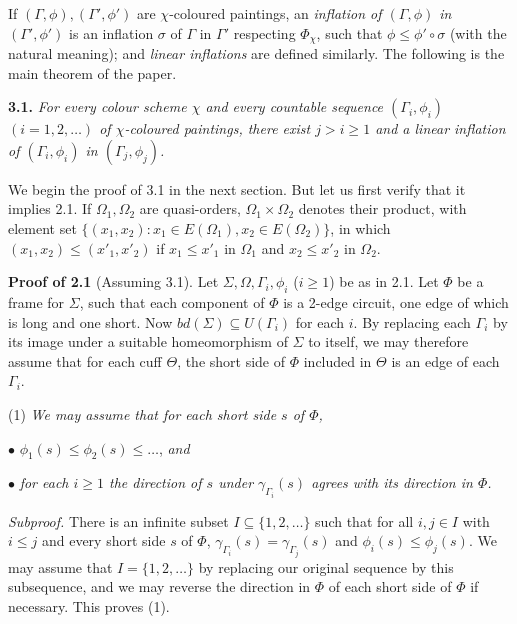 If $(\Gamma,\phi),(\Gamma',\phi')$ are $\chi$-coloured paintings, an \textit{inflation of $(\Gamma,\phi)$ in $(\Gamma',\phi')$} is an inflation $\sigma$ of $\Gamma$ in $\Gamma'$ respecting $\Phi_\chi$, such that $\phi\le \phi'\circ \sigma$ (with the natural meaning); and \textit{linear inflations} are defined similarly. The following is the main theorem of the paper.

\textbf{3.1.} \textit{For every colour scheme $\chi$ and every countable sequence $(\Gamma_i,\phi_i)$ $(i=1,2,\dots)$ of $\chi$-coloured paintings, there exist $j>i\ge 1$ and a linear inflation of $(\Gamma_i,\phi_i)$ in $(\Gamma_j,\phi_j)$.}

We begin the proof of 3.1 in the next section. But let us first verify that it implies 2.1. If $\Omega_1,\Omega_2$ are quasi-orders, $\Omega_1\times \Omega_2$ denotes their product, with element set $\{(x_1,x_2):x_1\in E(\Omega_1), x_2\in E(\Omega_2)\}$, in which $(x_1,x_2)\le (x'_1,x'_2)$ if $x_1\le x'_1$ in $\Omega_1$ and $x_2\le x'_2$ in $\Omega_2$.

\textbf{Proof of 2.1} (Assuming 3.1). Let $\Sigma,\Omega,\Gamma_i,\phi_i$ ($i\ge 1$) be as in 2.1. Let $\Phi$ be a frame for $\Sigma$, such that each component of $\Phi$ is a 2-edge circuit, one edge of which is long and one short. Now $bd(\Sigma)\subseteq U(\Gamma_i)$ for each $i$. By replacing each $\Gamma_i$ by its image under a suitable homeomorphism of $\Sigma$ to itself, we may therefore assume that for each cuff $\Theta$, the short side of $\Phi$ included in $\Theta$ is an edge of each $\Gamma_i$.

\hspace*{12pt}(1) \textit{We may assume that for each short side $s$ of $\Phi$,}

\hspace*{12pt}$\bullet$ $\phi_1(s)\le \phi_2(s)\le \dots$, \textit{and}

\hspace*{12pt}$\bullet$ \textit{for each $i\ge 1$ the direction of $s$ under $\gamma_{\Gamma_i}(s)$ agrees with its direction in $\Phi$.}

\textit{Subproof.} There is an infinite subset $I\subseteq \{1,2,\dots\}$ such that for all $i,j\in I$ with $i\le j$ and every short side $s$ of $\Phi$, $\gamma_{\Gamma_i}(s)=\gamma_{\Gamma_j}(s)$ and $\phi_i(s)\le \phi_j(s)$. We may assume that $I=\{1,2,\dots\}$ by replacing our original sequence by this subsequence, and we may reverse the direction in $\Phi$ of each short side of $\Phi$ if necessary. This proves (1).

